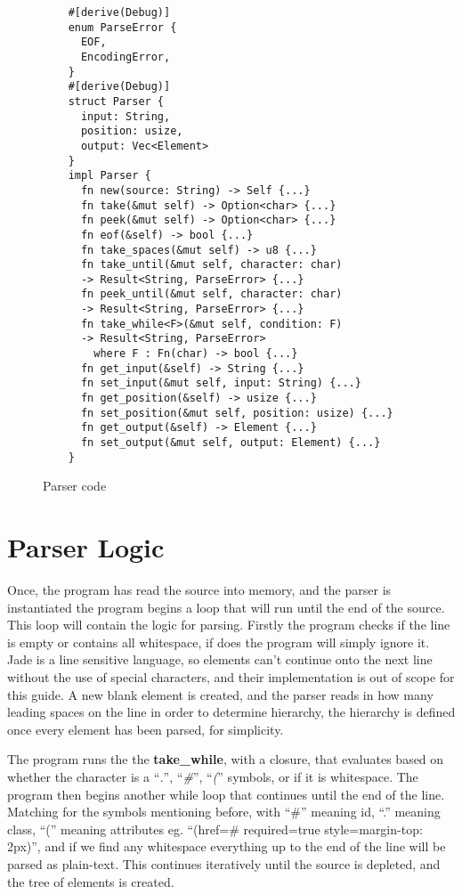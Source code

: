 \begin{figure}[!hbtp]
    \small
  \begin{verbatim}
    #[derive(Debug)]
    enum ParseError {
      EOF,
      EncodingError,
    }
    #[derive(Debug)]
    struct Parser {
      input: String,
      position: usize,
      output: Vec<Element>
    }
    impl Parser {
      fn new(source: String) -> Self {...}
      fn take(&mut self) -> Option<char> {...}
      fn peek(&mut self) -> Option<char> {...}
      fn eof(&self) -> bool {...}
      fn take_spaces(&mut self) -> u8 {...}
      fn take_until(&mut self, character: char) 
      -> Result<String, ParseError> {...}
      fn peek_until(&mut self, character: char) 
      -> Result<String, ParseError> {...}
      fn take_while<F>(&mut self, condition: F) 
      -> Result<String, ParseError> 
        where F : Fn(char) -> bool {...}
      fn get_input(&self) -> String {...}
      fn set_input(&mut self, input: String) {...}
      fn get_position(&self) -> usize {...}
      fn set_position(&mut self, position: usize) {...}
      fn get_output(&self) -> Element {...}
      fn set_output(&mut self, output: Element) {...}
    }
  \end{verbatim}
  \caption{Parser code}
\end{figure}
\newpage
\section{Parser Logic}
Once, the program has read the source into memory, and the parser is instantiated the program begins a loop that will run until the end of the source. This loop will contain the logic for parsing. Firstly the program checks if the line is empty or contains all whitespace, if does the program will simply ignore it. Jade is a line sensitive language, so elements can't continue onto the next line without the use of special characters, and their implementation is out of scope for this guide. A new blank element is created, and the parser reads in how many leading spaces on the line in order to determine hierarchy, the hierarchy is defined once every element has been parsed, for simplicity.

The program runs the the \textbf{take\_while}, with a closure, that evaluates based on whether the character is a ``\textit{.}'', ``\textit{\#}'', ``\textit{(}'' symbols, or if it is whitespace. The program then begins another while loop that continues until the end of the line. Matching for the symbols mentioning before, with ``\#'' meaning id, ``.'' meaning class, ``('' meaning attributes eg. ``(href=\textquotedbl{}\#\textquotedbl{} required=\textquotedbl{}true\textquotedbl{} style=\textquotedbl{}margin-top: 2px\textquotedbl{})'', and if we find any whitespace everything up to the end of the line will be parsed as plain-text. This continues iteratively until the source is depleted, and the tree of elements is created.